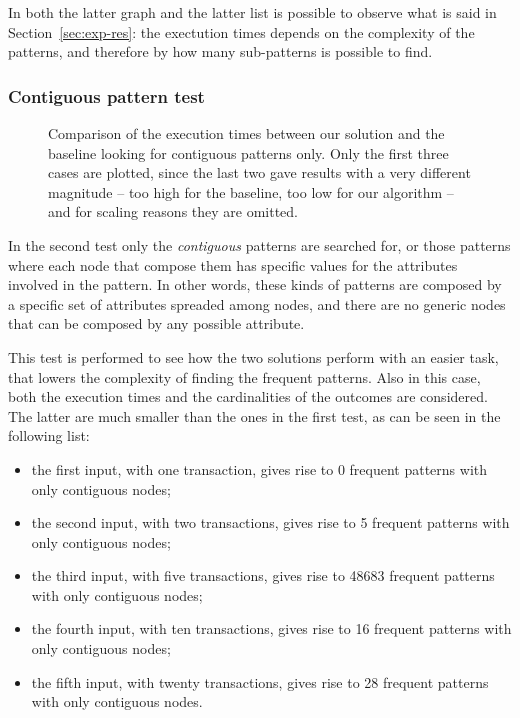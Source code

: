 \documentclass{acm_proc_article-sp-sigmod09}
\begin{document}
In both the latter graph and the latter list is possible to observe what is said in Section~\ref{sec:exp-res}: the exectution times depends on the complexity of the patterns, and therefore by how many sub-patterns is possible to find.

\subsubsection{Contiguous pattern test}

\begin{figure}
\centering
{}
\caption{Comparison of the execution times between our solution and the baseline looking for contiguous patterns only. Only the first three cases are plotted, since the last two gave results with a very different magnitude -- too high for the baseline, too low for our algorithm -- and for scaling reasons they are omitted.}
\label{fig:testtwo}
\end{figure}

In the second test only the \emph{contiguous} patterns are searched for, or those patterns where each node that compose them has specific values for the attributes involved in the pattern. In other words, these kinds of patterns are composed by a specific set of attributes spreaded among nodes, and there are no generic nodes that can be composed by any possible attribute.

This test is performed to see how the two solutions perform with an easier task, that lowers the complexity of finding the frequent patterns. Also in this case, both the execution times and the cardinalities of the outcomes are considered. The latter are much smaller than the ones in the first test, as can be seen in the following list:
\begin{itemize}
\item the first input, with one transaction, gives rise to 0 frequent patterns with only contiguous nodes;
\item the second input, with two transactions, gives rise to 5 frequent patterns with only contiguous nodes;
\item the third input, with five transactions, gives rise to 48683 frequent patterns with only contiguous nodes;
\item the fourth input, with ten transactions, gives rise to 16 frequent patterns with only contiguous nodes;
\item the fifth input, with twenty transactions, gives rise to 28 frequent patterns with only contiguous nodes.
\end{itemize}
\end{document}

